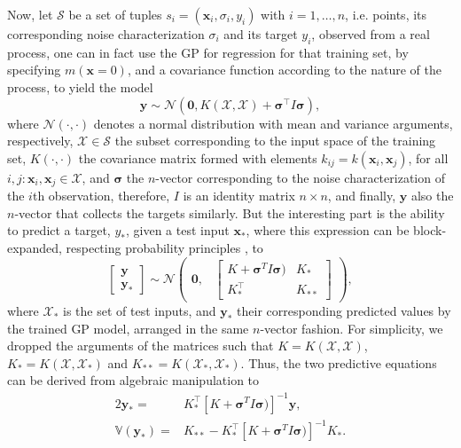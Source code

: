 Now, let $\mathcal{S}$ be a set of tuples $s_i = (\mathbf{x}_i, \sigma_i, y_i)$ with $i=1,\ldots,n$, i.e. points, its corresponding noise characterization $\sigma_i$ and its target $y_i$, observed from a real process, one can in fact use the GP for regression for that training set, by specifying $m(\mathbf{x}=0)$, and a covariance function according to the nature of the process, to yield the model
\begin{equation}
\mathbf{y} \sim \mathcal{N}(\mathbf{0}, K(\mathcal{X},\mathcal{X}) + \boldsymbol{\sigma}^\top I \boldsymbol{\sigma}), \label{eq:gp_model}
\end{equation}
where $\mathcal{N}(\cdot, \cdot)$ denotes a normal distribution with mean and variance arguments, respectively, $\mathcal{X} \in \mathcal{S}$ the subset corresponding to the input space of the training set,  $K(\cdot, \cdot)$ the covariance matrix formed with elements $k_{ij} = k(\mathbf{x}_i, \mathbf{x}_j)$, for all $i,j : \mathbf{x}_i, \mathbf{x}_j \in \mathcal{X}$, and $\boldsymbol{\sigma}$ the $n$-vector corresponding to the noise characterization of the $i$th observation, therefore, $I$ is an identity matrix $n \times n$, and finally, $\mathbf{y}$ also the $n$-vector that collects the targets similarly. But the interesting part is the ability to predict a target, $y_*$, given a test input $\mathbf{x}_*$, where this expression can be block-expanded, respecting probability principles \citep{Rasmussen2006Gaussian}, to
\begin{equation}
    \begin{bmatrix} \mathbf{y} \\ \mathbf{y}_* \end{bmatrix} \sim
               \mathcal{N}\begin{pmatrix}\mathbf{0}, & \begin{bmatrix} K + \boldsymbol{\sigma}^{T} I \boldsymbol{\sigma}) &
                                                 K_* \\
                                                 K_*^\top &
                                                 K_{**} \end{bmatrix}
                           \end{pmatrix},
\end{equation}
where $\mathcal{X}_*$ is the set of test inputs, and $\mathbf{y}_*$ their corresponding predicted values by the trained GP model, arranged in the same $n$-vector fashion. For simplicity, we dropped the arguments of the matrices such that $K = K(\mathcal{X},\mathcal{X})$, $K_* = K(\mathcal{X},\mathcal{X}_*)$ and $K_{**} = K(\mathcal{X}_*,\mathcal{X}_*)$. Thus, the two  predictive equations can be derived from algebraic manipulation to
\begin{alignat}{2}
	\mathbf{y}_* = & K_*^\top [K + \boldsymbol{\sigma}^{T} I \boldsymbol{\sigma})]^{-1}\mathbf{y}, \label{eq:f_prediction}\\
	\mathbb{V}(\mathbf{y}_*) = & K_{**} - K_*^\top[K + \boldsymbol{\sigma}^{T} I \boldsymbol{\sigma})]^{-1} K_*. \label{eq:variance_f}
\end{alignat}

